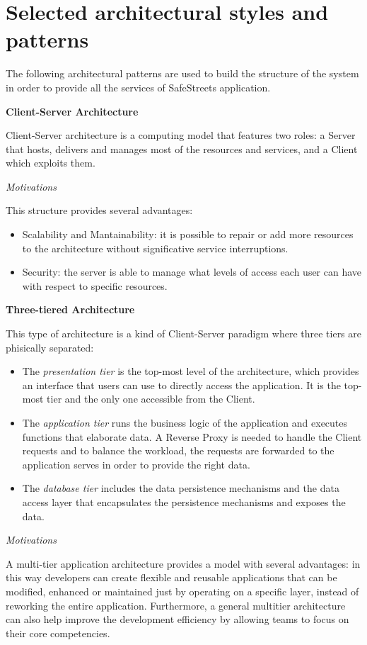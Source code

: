 \documentclass{report}
\begin{document}
\section{Selected architectural	styles and patterns}
The following architectural patterns are used to build the structure of the system in order to provide all the services of SafeStreets application.\\

\begin{center}\large{\textbf{Client-Server Architecture}}\end{center}
Client-Server architecture is a computing model that features two roles: a Server that hosts, delivers and manages most of the resources and services, and a Client which exploits them.
\begin{center}\large{\textit{Motivations}}\end{center}
\noindent This structure provides several advantages:
\begin{itemize}
    \item Scalability and Mantainability: it is possible to repair or add more resources to the architecture without significative service interruptions.
    \item Security: the server is able to manage what levels of access each user can have with respect to specific resources.
\end{itemize}\vspace{2mm}

\begin{center}\large{\textbf{Three-tiered Architecture}}\end{center}
This type of architecture is a kind of Client-Server paradigm where three tiers are phisically separated:
\begin{itemize}
	\item The \textit{presentation tier} is the top-most level of the architecture, which provides an interface that users can use to directly access the application. 
	It is the top-most tier and the only one accessible from the Client.
	\item The \textit{application tier} runs the business logic of the application and executes functions that elaborate data. 
	A Reverse Proxy is needed to handle the Client requests and to balance the workload, the requests are forwarded to 
	the application serves in order to provide the right data.
	\item The \textit{database tier} includes the data persistence mechanisms and the data access layer that encapsulates 
	the persistence mechanisms and exposes the data.
\end{itemize}
\begin{center}\large{\textit{Motivations}}\end{center}
A multi-tier application architecture provides a model with several advantages: in this way developers can create flexible and reusable 
applications that can be modified, enhanced or maintained just by operating on a specific layer, instead of reworking the entire application. Furthermore, a general multitier architecture can also help improve the development efficiency by allowing teams to focus on their core competencies.
\end{document}
